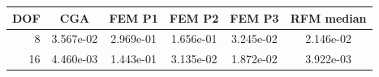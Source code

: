 \begin{tabular}{rccccc}
\toprule
DOF & CGA & FEM P1 & FEM P2 & FEM P3 & RFM median \\
\midrule
8 & 3.567e-02 & 2.969e-01 & 1.656e-01 & 3.245e-02 & 2.146e-02 \\
16 & 4.460e-03 & 1.443e-01 & 3.135e-02 & 1.872e-02 & 3.922e-03 \\
\bottomrule
\end{tabular}

